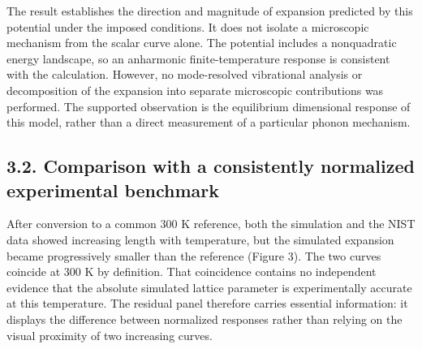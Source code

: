 \documentclass[10pt,a4paper,twocolumn]{article}
\begin{document}
The result establishes the direction and magnitude of expansion predicted by this potential under the imposed conditions. It does not isolate a microscopic mechanism from the scalar curve alone. The potential includes a nonquadratic energy landscape, so an anharmonic finite-temperature response is consistent with the calculation. However, no mode-resolved vibrational analysis or decomposition of the expansion into separate microscopic contributions was performed. The supported observation is the equilibrium dimensional response of this model, rather than a direct measurement of a particular phonon mechanism.


\subsection*{3.2. Comparison with a consistently normalized experimental benchmark}

After conversion to a common 300 K reference, both the simulation and the NIST data showed increasing length with temperature, but the simulated expansion became progressively smaller than the reference (Figure 3). The two curves coincide at 300 K by definition. That coincidence contains no independent evidence that the absolute simulated lattice parameter is experimentally accurate at this temperature. The residual panel therefore carries essential information: it displays the difference between normalized responses rather than relying on the visual proximity of two increasing curves.
\end{document}
